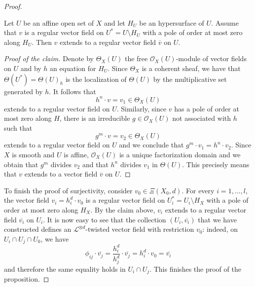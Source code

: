 \documentclass[10pt,a4paper]{amsart}
\begin{document}
\begin{proof}
\begin{claimproof} 
Let $U$ be an affine open set of $X$ and let $H_U$ be an hypersurface of $U$. Assume that $v$ is a regular vector field on $U^\ast = U \setminus H_U$ with a pole of order at most zero along $H_U$. Then $v$ extends to a regular vector field $\overline{v}$ on $U$. 
\end{claimproof}

\begin{proof}[Proof of the claim] 
Denote by $\Theta_X(U)$ the free $\mathcal O_X(U)$-module of vector fields on $U$ and by $h$ an equation for $H_U$. Since $\Theta_X$ is a coherent sheaf, we have that $\Theta(U^\ast) = \Theta(U)_h$
is the localization of $\Theta(U)$ by the multiplicative set generated by $h$. It follows that 
$$h^n \cdot v  = v_1 \in \Theta_X(U)$$ 
extends to a regular vector field on $U$. Similarly, since $v$ has a pole of order at most zero along $H$, there is an irreducible $g \in \mathcal O_X(U)$  not associated with $h$ such that 
$$ g^m \cdot v = v_2 \in \Theta_X(U)$$
extends to a regular vector field on $U$ and we conclude that
$g^m\cdot v_1 = h^n \cdot v_2$.
Since  $X$ is smooth and $U$ is affine, $\mathcal O_X(U)$ is a unique factorization domain and we obtain that $g^m$ divides $v_2$ and that $h^n$ divides $v_1$ in $\Theta(U)$. This precisely means that $v$ extends to a vector field $\overline{v}$ on $U$. 
\end{proof} 
To finish the proof of surjectivity, consider $v_0 \in \Xi(X_0,d)$. 
For every $i = 1,\ldots, l$, the vector field $v_i = h_i^d \cdot v_0$ is a regular vector field on $U_i^\ast = U_i \setminus H_X$ with a pole of order at most zero along $H_X$. By the claim above, $v_i$ extends to a regular vector field $\overline{v_i}$ on $U_i$. It is now easy to see that the collection $(U_i, \overline{v_i})$ that we have constructed defines an $\mathcal L^{\otimes d}$-twisted vector field with restriction $v_0$: indeed, on $U_i \cap U_j \cap U_0$, we have
$$ \phi_{ij} \cdot \overline{v_j} = \frac{h_i^d}{h_j^d} \cdot \overline{v_j} =  h_i^d \cdot v_0 = \overline{v_i}$$  
and therefore the same equality holds in $U_i \cap U_j$. This finishes the proof of the proposition.
\end{proof}
\end{document}
